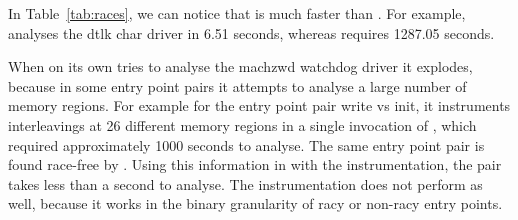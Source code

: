 In Table~\ref{tab:races}, we can notice that \whoop is much faster than \corral. For example, \whoop analyses the dtlk char driver in 6.51 seconds, whereas \corral requires 1287.05 seconds.

When \corral on its own tries to analyse the machzwd watchdog driver it explodes, because in some entry point pairs it attempts to analyse a large number of memory regions. For example for the entry point pair write vs init, it instruments interleavings at 26 different memory regions in a single invocation of \corral, which required approximately 1000 seconds to analyse. The same entry point pair is found race-free by \whoop. Using this information in \corral with the \yieldmr instrumentation, the pair takes less than a second to analyse. The \yieldcoarse instrumentation does not perform as well, because it works in the binary granularity of racy or non-racy entry points.